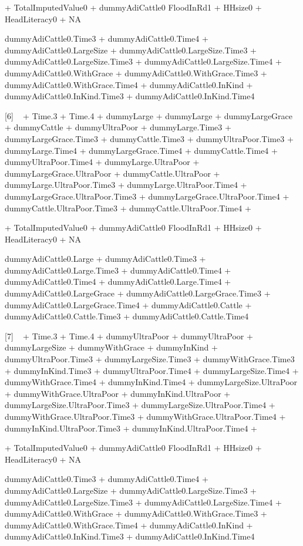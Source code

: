 \begin{Schunk}
\begin{Soutput}
 + TotalImputedValue0
 + dummyAdiCattle0
FloodInRd1 + HHsize0 + HeadLiteracy0 + NA

dummyAdiCattle0.Time3 + dummyAdiCattle0.Time4 + dummyAdiCattle0.LargeSize + dummyAdiCattle0.LargeSize.Time3
 + dummyAdiCattle0.LargeSize.Time3 + dummyAdiCattle0.LargeSize.Time4 + dummyAdiCattle0.WithGrace
 + dummyAdiCattle0.WithGrace.Time3 + dummyAdiCattle0.WithGrace.Time4 + dummyAdiCattle0.InKind
 + dummyAdiCattle0.InKind.Time3 + dummyAdiCattle0.InKind.Time4

 

[6]
 ~  + Time.3 + Time.4 + dummyLarge
 + dummyLarge + dummyLargeGrace + dummyCattle
 + dummyUltraPoor + dummyLarge.Time3 + dummyLargeGrace.Time3
 + dummyCattle.Time3 + dummyUltraPoor.Time3 + dummyLarge.Time4
 + dummyLargeGrace.Time4 + dummyCattle.Time4 + dummyUltraPoor.Time4
 + dummyLarge.UltraPoor + dummyLargeGrace.UltraPoor + dummyCattle.UltraPoor
 + dummyLarge.UltraPoor.Time3 + dummyLarge.UltraPoor.Time4 + dummyLargeGrace.UltraPoor.Time3
 + dummyLargeGrace.UltraPoor.Time4 + dummyCattle.UltraPoor.Time3 + dummyCattle.UltraPoor.Time4
 + 

 + TotalImputedValue0
 + dummyAdiCattle0
FloodInRd1 + HHsize0 + HeadLiteracy0 + NA

dummyAdiCattle0.Large + dummyAdiCattle0.Time3 + dummyAdiCattle0.Large.Time3 + dummyAdiCattle0.Time4
 + dummyAdiCattle0.Time4 + dummyAdiCattle0.Large.Time4 + dummyAdiCattle0.LargeGrace
 + dummyAdiCattle0.LargeGrace.Time3 + dummyAdiCattle0.LargeGrace.Time4 + dummyAdiCattle0.Cattle
 + dummyAdiCattle0.Cattle.Time3 + dummyAdiCattle0.Cattle.Time4

 

[7]
 ~  + Time.3 + Time.4 + dummyUltraPoor
 + dummyUltraPoor + dummyLargeSize + dummyWithGrace
 + dummyInKind + dummyUltraPoor.Time3 + dummyLargeSize.Time3
 + dummyWithGrace.Time3 + dummyInKind.Time3 + dummyUltraPoor.Time4
 + dummyLargeSize.Time4 + dummyWithGrace.Time4 + dummyInKind.Time4
 + dummyLargeSize.UltraPoor + dummyWithGrace.UltraPoor + dummyInKind.UltraPoor
 + dummyLargeSize.UltraPoor.Time3 + dummyLargeSize.UltraPoor.Time4 + dummyWithGrace.UltraPoor.Time3
 + dummyWithGrace.UltraPoor.Time4 + dummyInKind.UltraPoor.Time3 + dummyInKind.UltraPoor.Time4
 + 

 + TotalImputedValue0
 + dummyAdiCattle0
FloodInRd1 + HHsize0 + HeadLiteracy0 + NA

dummyAdiCattle0.Time3 + dummyAdiCattle0.Time4 + dummyAdiCattle0.LargeSize + dummyAdiCattle0.LargeSize.Time3
 + dummyAdiCattle0.LargeSize.Time3 + dummyAdiCattle0.LargeSize.Time4 + dummyAdiCattle0.WithGrace
 + dummyAdiCattle0.WithGrace.Time3 + dummyAdiCattle0.WithGrace.Time4 + dummyAdiCattle0.InKind
 + dummyAdiCattle0.InKind.Time3 + dummyAdiCattle0.InKind.Time4

 
\end{Soutput}
\end{Schunk}
